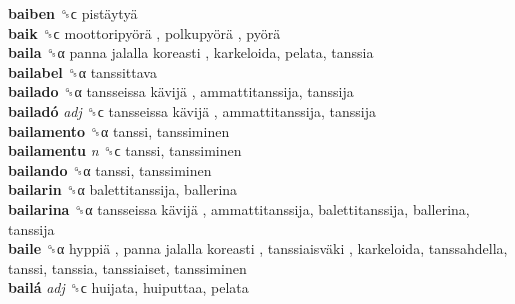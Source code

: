 \textbf{baiben} ␝ϲ   pistäytyä   \\
\textbf{baik} ␝ϲ   moottoripyörä ,  polkupyörä ,  pyörä   \\
\textbf{baila} ␝α   panna jalalla koreasti , karkeloida, pelata, tanssia  \\
\textbf{bailabel} ␝α  tanssittava  \\
\textbf{bailado} ␝α   tansseissa kävijä , ammattitanssija, tanssija  \\
\textbf{bailadó} \emph{adj}  ␝ϲ   tansseissa kävijä , ammattitanssija, tanssija  \\
\textbf{bailamento} ␝α  tanssi, tanssiminen  \\
\textbf{bailamentu} \emph{n}  ␝ϲ  tanssi, tanssiminen  \\
\textbf{bailando} ␝α  tanssi, tanssiminen  \\
\textbf{bailarin} ␝α  balettitanssija, ballerina  \\
\textbf{bailarina} ␝α   tansseissa kävijä , ammattitanssija, balettitanssija, ballerina, tanssija  \\
\textbf{baile} ␝α   hyppiä ,  panna jalalla koreasti ,  tanssiaisväki , karkeloida, tanssahdella, tanssi, tanssia, tanssiaiset, tanssiminen  \\
\textbf{bailá} \emph{adj}  ␝ϲ  huijata, huiputtaa, pelata  \\
